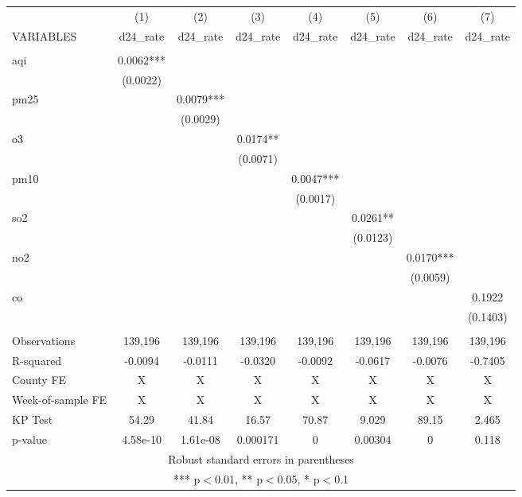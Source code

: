 \documentclass[]{article}
\begin{document}
\begin{tabular}{lccccccc} \hline
 & (1) & (2) & (3) & (4) & (5) & (6) & (7) \\
VARIABLES & d24\_rate & d24\_rate & d24\_rate & d24\_rate & d24\_rate & d24\_rate & d24\_rate \\ \hline
 &  &  &  &  &  &  &  \\
aqi & 0.0062*** &  &  &  &  &  &  \\
 & (0.0022) &  &  &  &  &  &  \\
pm25 &  & 0.0079*** &  &  &  &  &  \\
 &  & (0.0029) &  &  &  &  &  \\
o3 &  &  & 0.0174** &  &  &  &  \\
 &  &  & (0.0071) &  &  &  &  \\
pm10 &  &  &  & 0.0047*** &  &  &  \\
 &  &  &  & (0.0017) &  &  &  \\
so2 &  &  &  &  & 0.0261** &  &  \\
 &  &  &  &  & (0.0123) &  &  \\
no2 &  &  &  &  &  & 0.0170*** &  \\
 &  &  &  &  &  & (0.0059) &  \\
co &  &  &  &  &  &  & 0.1922 \\
 &  &  &  &  &  &  & (0.1403) \\
 &  &  &  &  &  &  &  \\
Observations & 139,196 & 139,196 & 139,196 & 139,196 & 139,196 & 139,196 & 139,196 \\
R-squared & -0.0094 & -0.0111 & -0.0320 & -0.0092 & -0.0617 & -0.0076 & -0.7405 \\
County FE & X & X & X & X & X & X & X \\
Week-of-sample FE & X & X & X & X & X & X & X \\
KP Test & 54.29 & 41.84 & 16.57 & 70.87 & 9.029 & 89.15 & 2.465 \\
 p-value & 4.58e-10 & 1.61e-08 & 0.000171 & 0 & 0.00304 & 0 & 0.118 \\ \hline
\multicolumn{8}{c}{ Robust standard errors in parentheses} \\
\multicolumn{8}{c}{ *** p$<$0.01, ** p$<$0.05, * p$<$0.1} \\
\end{tabular}
\end{document}
